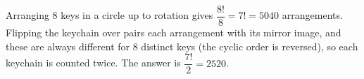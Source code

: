 Arranging $8$ keys in a circle up to rotation gives $\dfrac{8!}{8}=7!=5040$ arrangements. Flipping the keychain over pairs each arrangement with its mirror image, and these are always different for $8$ distinct keys (the cyclic order is reversed), so each keychain is counted twice. The answer is $\dfrac{7!}{2}=\boxed{2520}$.
